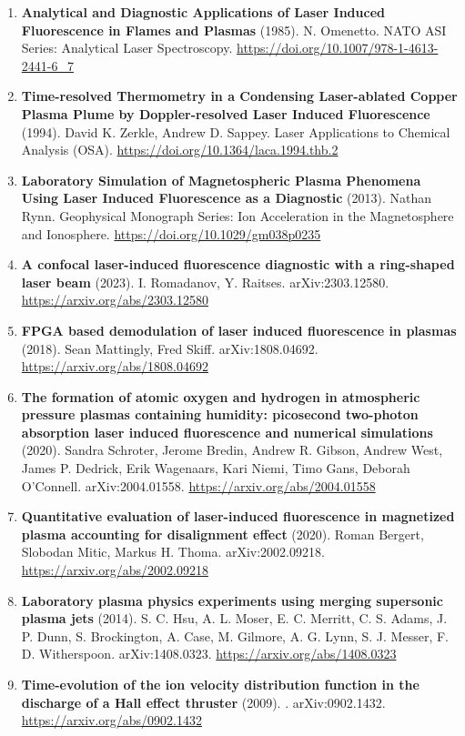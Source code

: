 \documentclass[11pt,a4paper]{article}
\begin{document}
\begin{enumerate}[leftmargin=1.4em]
\item \textbf{Analytical and Diagnostic Applications of Laser Induced Fluorescence in Flames and Plasmas} (1985). N. Omenetto. NATO ASI Series: Analytical Laser Spectroscopy. \url{https://doi.org/10.1007/978-1-4613-2441-6_7}
\item \textbf{Time-resolved Thermometry in a Condensing Laser-ablated Copper Plasma Plume by Doppler-resolved Laser Induced Fluorescence} (1994). David K. Zerkle, Andrew D. Sappey. Laser Applications to Chemical Analysis (OSA). \url{https://doi.org/10.1364/laca.1994.thb.2}
\item \textbf{Laboratory Simulation of Magnetospheric Plasma Phenomena Using Laser Induced Fluorescence as a Diagnostic} (2013). Nathan Rynn. Geophysical Monograph Series: Ion Acceleration in the Magnetosphere and Ionosphere. \url{https://doi.org/10.1029/gm038p0235}
\item \textbf{A confocal laser-induced fluorescence diagnostic with a ring-shaped laser beam} (2023). I. Romadanov, Y. Raitses. arXiv:2303.12580. \url{https://arxiv.org/abs/2303.12580}
\item \textbf{FPGA based demodulation of laser induced fluorescence in plasmas} (2018). Sean Mattingly, Fred Skiff. arXiv:1808.04692. \url{https://arxiv.org/abs/1808.04692}
\item \textbf{The formation of atomic oxygen and hydrogen in atmospheric pressure plasmas containing humidity: picosecond two-photon absorption laser induced fluorescence and numerical simulations} (2020). Sandra Schroter, Jerome Bredin, Andrew R. Gibson, Andrew West, James P. Dedrick, Erik Wagenaars, Kari Niemi, Timo Gans, Deborah O'Connell. arXiv:2004.01558. \url{https://arxiv.org/abs/2004.01558}
\item \textbf{Quantitative evaluation of laser-induced fluorescence in magnetized plasma accounting for disalignment effect} (2020). Roman Bergert, Slobodan Mitic, Markus H. Thoma. arXiv:2002.09218. \url{https://arxiv.org/abs/2002.09218}
\item \textbf{Laboratory plasma physics experiments using merging supersonic plasma jets} (2014). S. C. Hsu, A. L. Moser, E. C. Merritt, C. S. Adams, J. P. Dunn, S. Brockington, A. Case, M. Gilmore, A. G. Lynn, S. J. Messer, F. D. Witherspoon. arXiv:1408.0323. \url{https://arxiv.org/abs/1408.0323}
\item \textbf{Time-evolution of the ion velocity distribution function in the discharge of a Hall effect thruster} (2009). . arXiv:0902.1432. \url{https://arxiv.org/abs/0902.1432}

\end{enumerate}
\end{document}
